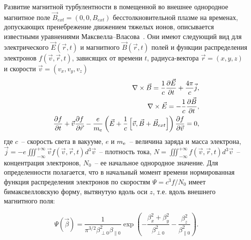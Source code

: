 Развитие магнитной турбулентности в помещенной во внешнее однородное магнитное поле $\vec{B}_{ext}=(0, 0, B_{ext})$ бесстолкновительной плазме на временах, допускающих пренебрежение движением тяжелых ионов, описывается известными уравнениями  Максвелла--Власова~\cite{???}. Они имеют следующий вид  для электрического $\vec{E}(\vec{r}, t)$ и магнитного $\vec{B}(\vec{r}, t)$ полей и функции распределения электронов $f(\vec{v},\vec{r}, t)$, зависящих от времени $t$, радиуса-вектора $\vec{r}=\left(x,y,z\right)$ и скорости $\vec{v}=\left(v_x,v_y,v_z\right)$
\begin{align}
     \label{eq:maxw1} 
    \nabla \times \vec{B}=\dfrac{1}{c}\dfrac{\partial \vec{E}}{\partial t}+\dfrac{4\pi}{c}\vec{j}, \\
    \label{eq:maxw2}
    \nabla \times \vec{E}=-\dfrac{1}{c}\dfrac{\partial \vec{B}}{\partial t}, \\
    \dfrac{\partial f}{\partial t}+\vec{v}\dfrac{\partial f}{\partial \vec{r}}-\dfrac{e}{m_\mathrm{e}} \left(\vec{E}+\dfrac{1}{c}\left[\vec{v},\vec{B}+\vec{B}_{ext}\right]\right) \dfrac{\partial f}{\partial \vec{v}}=0,
    \label{eq:Vlasov}
\end{align}
где $c$~-- скорость света в вакууме, $e$ и $m_\mathrm{e}$~-- величина заряда и масса электрона, $\vec{j}=-e\iiint^{+\infty}_{-\infty}\vec{v}f(\vec{v},\vec{r}, t) d^3\vec{v}$~-- плотность тока, $N=\iiint^{+\infty}_{-\infty}f(\vec{v},\vec{r}, t) d^3\vec{v}$~-- концентрация электронов, $N_0$~-- ее начальное однородное значение. Для определенности полагается, что в начальный момент времени нормированная функция распределения электронов по скоростям $\Psi = c^3f/N_0$ имеет бимаксвелловскую форму, вытянутую вдоль оси $z$, т.е. вдоль внешнего магнитного поля:


\begin{equation}
\label{bimax}
\Psi(\vec{\beta})=\dfrac{1}{\pi^{3/2}\beta_{\perp 0}^2 \beta_{\| 0} } \exp\left(-\dfrac{\beta_x^2+\beta_y^2}{\beta_{\perp 0}^2}-\dfrac{\beta_z^2}{\beta_{\| 0}^2}\right).
\end{equation}

